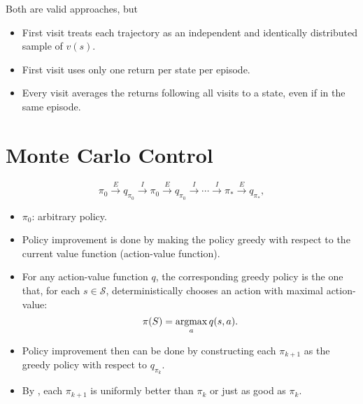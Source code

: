 Both are valid approaches, but
\begin{itemize}
	\item First visit treats each trajectory as an independent and identically distributed sample of $v(s)$.
	\item First visit uses only one return per state per episode.
	\item Every visit averages the returns following all visits to a state, even if in the same episode.
\end{itemize}
%

\section{Monte Carlo Control}
$$\pi_0\xrightarrow{\,E\,} q_{\pi_0} \xrightarrow{\,I\,} \pi_0\xrightarrow{\,E\,} q_{\pi_0}\xrightarrow{\,I\,}\cdots \xrightarrow{\,I\,} \pi_*\xrightarrow{\,E\,} q_{\pi_*},$$
\begin{itemize}
	\item $\pi_0$: arbitrary policy.
	\item Policy improvement is done by making the policy greedy with respect to the current value function (action-value function). 
	\item For any action-value function $q$, the corresponding greedy policy is the one that, for each $s\in \mathcal{S}$, deterministically chooses an action with maximal action-value:
		$$\pi(S) = \operatorname*{\operatorname{argmax}}_a q(s,a).$$
	\item Policy improvement then can be done by constructing each $\pi_{k+1}$ as the greedy policy with respect to $q_{\pi_k}.$
	\item By , each $\pi_{k+1}$ is uniformly better than $\pi_k$ or just as good as $\pi_k$.
\end{itemize}

